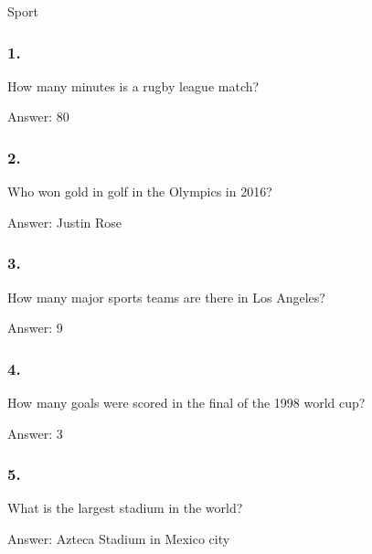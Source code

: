 \documentclass{beamer}
\begin{document}
    \begin{frame}
        \begin{center}
            \Huge Sport
        \end{center}
    \end{frame}


    \begin{frame}
        \frametitle{1.}
        How many minutes is a rugby league match?\\

        \begin{center}
            Answer: 80
        \end{center}
    \end{frame}

    \begin{frame}
        \frametitle{2.}
        Who won gold in golf in the Olympics in 2016?\\

        \begin{center}
            Answer: Justin Rose
        \end{center}
    \end{frame}

    \begin{frame}
        \frametitle{3.}
        How many major sports teams are there in Los Angeles?\\

        \begin{center}
            Answer: 9
        \end{center}
    \end{frame}

    \begin{frame}
        \frametitle{4.}
        How many goals were scored in the final of the 1998 world cup?\\

        \begin{center}
            Answer: 3
        \end{center}
    \end{frame}

    \begin{frame}
        \frametitle{5.}
        What is the largest stadium in the world?\\

        \begin{center}
            Answer: Azteca Stadium in Mexico city
        \end{center}
    \end{frame}
\end{document}
